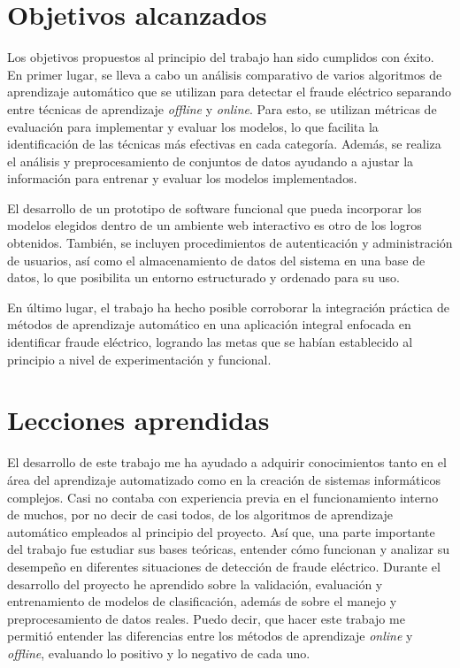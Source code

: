 \documentclass[12pt,a4paper]{report}
\begin{document}
\section{Objetivos alcanzados}

Los objetivos propuestos al principio del trabajo han sido cumplidos con éxito. En primer lugar, se lleva a cabo un análisis comparativo de varios algoritmos de aprendizaje automático que se utilizan para detectar el fraude eléctrico separando entre técnicas de aprendizaje \emph{offline} y \emph{online}. Para esto, se utilizan métricas de evaluación para implementar y evaluar los modelos, lo que facilita la identificación de las técnicas más efectivas en cada categoría. Además, se realiza el análisis y preprocesamiento de conjuntos de datos ayudando a ajustar la información para entrenar y evaluar los modelos implementados.

El desarrollo de un prototipo de software funcional que pueda incorporar los modelos elegidos dentro de un ambiente web interactivo es otro de los logros obtenidos. También, se incluyen procedimientos de autenticación y administración de usuarios, así como el almacenamiento de datos del sistema en una base de datos, lo que posibilita un entorno estructurado y ordenado para su uso.

En último lugar, el trabajo ha hecho posible corroborar la integración práctica de métodos de aprendizaje automático en una aplicación integral enfocada en identificar fraude eléctrico, logrando las metas que se habían establecido al principio a nivel de experimentación y funcional.


\section{Lecciones aprendidas}

El desarrollo de este trabajo me ha ayudado a adquirir conocimientos tanto en el área del aprendizaje automatizado como en la creación de sistemas informáticos complejos. Casi no contaba con experiencia previa en el funcionamiento interno de muchos, por no decir de casi todos, de los algoritmos de aprendizaje automático empleados al principio del proyecto. Así que, una parte importante del trabajo fue estudiar sus bases teóricas, entender cómo funcionan y analizar su desempeño en diferentes situaciones de detección de fraude eléctrico. Durante el desarrollo del proyecto he aprendido sobre la validación, evaluación y entrenamiento de modelos de clasificación, además de sobre el manejo y preprocesamiento de datos reales. Puedo decir, que hacer este trabajo me permitió entender las diferencias entre los métodos de aprendizaje \emph{online} y \emph{offline}, evaluando lo positivo y lo negativo de cada uno.
\end{document}
